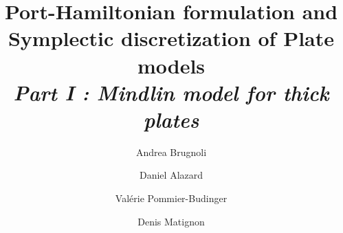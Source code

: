 \documentclass[preprint,12pt]{elsarticle}
\begin{document}
	
	\begin{frontmatter}	
		
		\title{Port-Hamiltonian formulation and \\ Symplectic discretization of Plate models \\
		\vspace{2mm}\large\textit{Part I : Mindlin model for thick plates}}	
		\author[ISAE]{Andrea Brugnoli}
		
		\author[ISAE]{Daniel Alazard}
		
		\author[ISAE]{Valérie Pommier-Budinger}
		
		\author[ISAE]{Denis Matignon}
		
		
		
		\address[ISAE]{ISAE-SUPAERO, Universit\'e de Toulouse, France.\\
		\vspace{2mm} {10 Avenue Edouard Belin, BP-54032, 31055 Toulouse Cedex 4.}}
		

\end{frontmatter}
\end{document}

